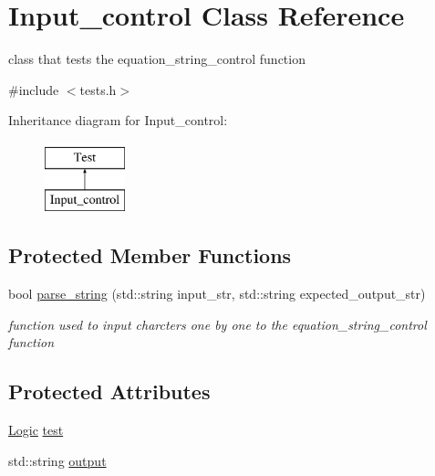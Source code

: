 \hypertarget{class_input__control}{}\section{Input\+\_\+control Class Reference}
\label{class_input__control}


class that tests the equation\+\_\+string\+\_\+control function  




{\ttfamily \#include $<$tests.\+h$>$}

Inheritance diagram for Input\+\_\+control\+:\begin{figure}[H]
\begin{center}
\leavevmode
\includegraphics[height=2.000000cm]{class_input__control}
\end{center}
\end{figure}
\subsection*{Protected Member Functions}
\begin{DoxyCompactItemize}
\item 
bool \mbox{\hyperlink{class_input__control_a4961e9c94d7171f539fd1d59026cdf4e}{parse\+\_\+string}} (std\+::string input\+\_\+str, std\+::string expected\+\_\+output\+\_\+str)
\begin{DoxyCompactList}\small\item\em function used to input charcters one by one to the equation\+\_\+string\+\_\+control function \end{DoxyCompactList}\end{DoxyCompactItemize}
\subsection*{Protected Attributes}
\begin{DoxyCompactItemize}
\item 
\mbox{\hyperlink{class_logic}{Logic}} \mbox{\hyperlink{class_input__control_a9f091f9aab11c64abcf05b305f0e8874}{test}}
\item 
std\+::string \mbox{\hyperlink{class_input__control_a91293c6ca347c29035190ee87abe4faf}{output}}
\end{DoxyCompactItemize}


